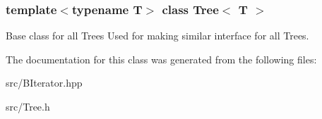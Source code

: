 \subsubsection*{template$<$typename T$>$\newline
class Tree$<$ T $>$}

Base class for all Trees  Used for making similar interface for all Trees. 

The documentation for this class was generated from the following files\+:\begin{DoxyCompactItemize}
\item 
src/B\+Iterator.\+hpp\item 
src/Tree.\+h\end{DoxyCompactItemize}
